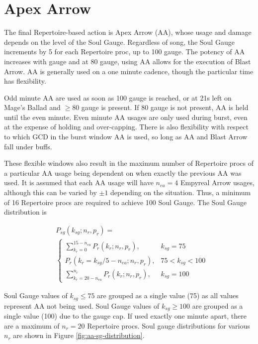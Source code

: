 \section{Apex Arrow}

The final Repertoire-based action is Apex Arrow (AA), whose usage and damage depends on the level of the Soul Gauge. Regardless of song, the Soul Gauge increments by 5 for each Repertoire proc, up to 100 gauge. The potency of AA increases with gauge and at 80 gauge, using AA allows for the execution of Blast Arrow. AA is generally used on a one minute cadence, though the particular time has flexibility. 

Odd minute AA are used as soon as 100 gauge is reached, or at 21s left on Mage's Ballad and $\ge 80$ gauge is present. If 80 gauge is not present, AA is held until the even minute. Even minute AA usages are only used during burst, even at the expense of holding and over-capping. There is also flexibility with respect to which GCD in the burst window AA is used, so long as AA and Blast Arrow fall under buffs.

These flexible windows also result in the maximum number of Repertoire procs of a particular AA usage being dependent on when exactly the previous AA was used. It is assumed that each AA usage will have $n_{ea} = 4$ Empyreal Arrow usages, although this can be varied by $\pm 1$ depending on the situation. Thus, a minimum of 16 Repertoire procs are required to achieve 100 Soul Gauge. The Soul Gauge distribution is

\begin{equation}
\begin{aligned}
&P_{sg}(k_{sg}; n_r, p_r) = \\
&\begin{cases}
    \displaystyle\sum_{k_r=0}^{15 - n_{ea}} P_r(k_r; n_r, p_r), & k_{sg} = 75 \\ 
    P_r(k_r = k_{sg} / 5 - n_{ea}; n_r, p_r), & 75 < k_{sg} < 100 \\
    \displaystyle\sum_{k_r=20 - n_{ea}}^{n_r} P_r(k_r; n_r, p_r), & k_{sg} = 100
\end{cases}   
\end{aligned}
\end{equation}

Soul Gauge values of $k_{sg} \le 75$ are grouped as a single value (75) as all values represent AA not being used. Soul Gauge values of $k_{sg} \ge 100$ are grouped as a single value (100) due to the gauge cap. If used exactly one minute apart, there are a maximum of $n_r = 20$ Repertoire procs. Soul gauge distributions for various $n_r$ are shown in Figure \ref{fig:aa-sg-distribution}.

